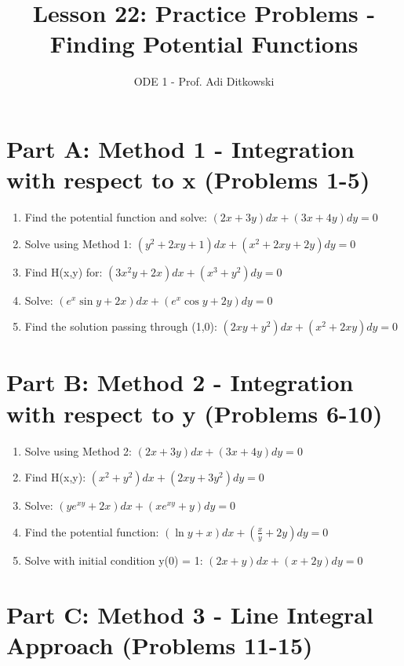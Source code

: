 \documentclass[12pt]{article}
\title{Lesson 22: Practice Problems - Finding Potential Functions}
\author{ODE 1 - Prof. Adi Ditkowski}
\date{}
\begin{document}
\maketitle

\section*{Part A: Method 1 - Integration with respect to x (Problems 1-5)}

\begin{enumerate}
\item Find the potential function and solve: $(2x + 3y)dx + (3x + 4y)dy = 0$

\item Solve using Method 1: $(y^2 + 2xy + 1)dx + (x^2 + 2xy + 2y)dy = 0$

\item Find H(x,y) for: $(3x^2y + 2x)dx + (x^3 + y^2)dy = 0$

\item Solve: $(e^x \sin y + 2x)dx + (e^x \cos y + 2y)dy = 0$

\item Find the solution passing through (1,0): $(2xy + y^2)dx + (x^2 + 2xy)dy = 0$
\end{enumerate}

\section*{Part B: Method 2 - Integration with respect to y (Problems 6-10)}

\begin{enumerate}[start=6]
\item Solve using Method 2: $(2x + 3y)dx + (3x + 4y)dy = 0$

\item Find H(x,y): $(x^2 + y^2)dx + (2xy + 3y^2)dy = 0$

\item Solve: $(ye^{xy} + 2x)dx + (xe^{xy} + y)dy = 0$

\item Find the potential function: $(\ln y + x)dx + \left(\frac{x}{y} + 2y\right)dy = 0$

\item Solve with initial condition y(0) = 1: $(2x + y)dx + (x + 2y)dy = 0$
\end{enumerate}

\section*{Part C: Method 3 - Line Integral Approach (Problems 11-15)}
\end{document}
